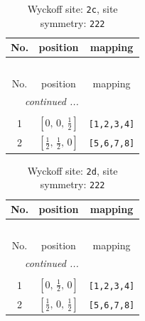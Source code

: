 \documentclass[fleqn,8pt]{jsarticle}
\begin{document}
\renewcommand{\arraystretch}{1.2}
\begin{longtable}{ccc}
\caption{Wyckoff site: {\tt 2c}, site symmetry: {\tt 222}}
 \\
 \hline \hline
No. & position & mapping \\ \hline \endfirsthead

\multicolumn{2}{l}{\tablename\ \thetable{}} \\
 \hline \hline
No. & position & mapping \\ \hline \endhead

 \hline \hline
\multicolumn{2}{r}{\footnotesize\it continued ...} \\ \endfoot

 \hline \hline
\multicolumn{2}{r}{} \\ \endlastfoot

1 & $\left[ 0,\, 0,\, \frac{1}{2} \right]$ & {\tt [1,2,3,4]} \\ \hline
2 & $\left[ \frac{1}{2},\, \frac{1}{2},\, 0 \right]$ & {\tt [5,6,7,8]} \\
\end{longtable}
\renewcommand{\arraystretch}{1.2}
\begin{longtable}{ccc}
\caption{Wyckoff site: {\tt 2d}, site symmetry: {\tt 222}}
 \\
 \hline \hline
No. & position & mapping \\ \hline \endfirsthead

\multicolumn{2}{l}{\tablename\ \thetable{}} \\
 \hline \hline
No. & position & mapping \\ \hline \endhead

 \hline \hline
\multicolumn{2}{r}{\footnotesize\it continued ...} \\ \endfoot

 \hline \hline
\multicolumn{2}{r}{} \\ \endlastfoot

1 & $\left[ 0,\, \frac{1}{2},\, 0 \right]$ & {\tt [1,2,3,4]} \\ \hline
2 & $\left[ \frac{1}{2},\, 0,\, \frac{1}{2} \right]$ & {\tt [5,6,7,8]} \\
\end{longtable}
\renewcommand{\arraystretch}{1.2}
\end{document}

